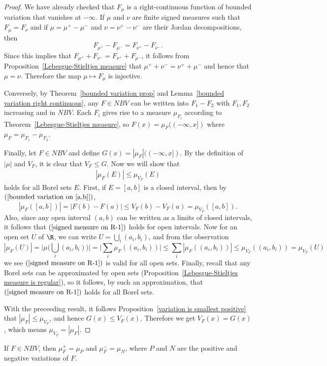 \begin{proof}
We have already checked that $F_\mu$ is a right-continuous function of bounded variation that vanishes at $-\infty$. If $\mu$ and $\nu$ are finite signed measures such that $F_\mu=F_\nu$ and if $\mu=\mu^+-\mu^-$ and $\nu=\nu^+-\nu^-$ are their Jordan decompositions, then
\[F_{\mu^+}-F_{\mu^-}=F_{\nu^+}-F_{\nu^-}.\]
Since this implies that $F_{\mu^+}+F_{\nu^-}=F_{\nu^+}+F_{\mu^-}$, it follows from Proposition~\ref{Lebesgue-Stieltjes measure} that $\mu^++\nu^-=\nu^++\mu^-$ and hence that $\mu=\nu$. Therefore the map $\mu\mapsto F_\mu$ is injective.\par
Conversely, by Theorem~\ref{bounded variation prop} and Lemma~\ref{bounded variation right continuous}, any $F\in NBV$ can be written into $F_1-F_2$ with $F_1,F_2$ increasing and in $NBV$. Each $F_i$ gives rise to a measure $\mu_{F_i}$ according to Theorem~\ref{Lebesgue-Stieltjes measure}, so $F(x)=\mu_F((-\infty,x])$ where $\mu_F=\mu_{F_1}-\mu_{F_2}$.\par
Finally, let $F\in NBV$ and define $G(x)=|\mu_F|((-\infty,x])$. By the definition of $|\mu|$ and $V_F$, it is clear that $V_F\leq G$. Now we will show that
\begin{align}\label{signed measure on R-1}
|\mu_F(E)|\leq\mu_{V_F}(E)
\end{align}
holds for all Borel sets $E$. First, if $E=[a,b]$ is a closed interval, then by $(\ref{bounded variation on [a,b]})$,
\[|\mu_F([a,b])|=|F(b)-F(a)|\leq V_F(b)-V_F(a)=\mu_{V_F}([a,b]).\]
Also, since any open interval $(a,b)$ can be written as a limits of closed intervals, it follows that $(\ref{signed measure on R-1})$ holds for open intervals. Now for an open set $U$ of $\R$, we can write $U=\bigcup_i(a_i,b_i)$, and from the observation
\[|\mu_F(U)|=\Big|\mu\Big(\bigcup_i(a_i,b_i)\Big)\Big|=\Big|\sum_{i}\mu_F((a_i,b_i))\Big|\leq\sum_i|\mu_F((a_i,b_i))|\leq\mu_{V_F}((a_i,b_i))=\mu_{V_F}(U)\]
we see $(\ref{signed measure on R-1})$ is valid for all open sets. Finally, recall that any Borel sets can be approximated by open sets (Proposition~\ref{Lebesgue-Stieltjes measure is regular}), so it follows, by such an approximation, that $(\ref{signed measure on R-1})$ holds for all Borel sets.\par
With the preceeding result, it follows Proposition~\ref{variation is smallest positive} that $|\mu_F|\leq\mu_{V_F}$, and hence $G(x)\leq V_F(x)$. Therefore we get $V_F(x)=G(x)$, which means $\mu_{V_F}=|\mu_F|$.
\end{proof}
\begin{corollary}
If $F\in NBV$, then $\mu_F^+=\mu_P$ and $\mu_F^-=\mu_N$, where $P$ and $N$ are the positive and negative variations of $F$.
\end{corollary}
